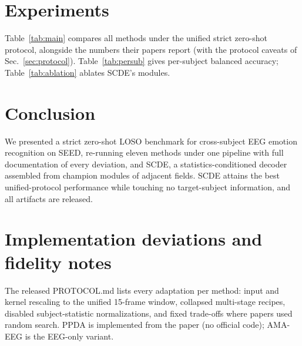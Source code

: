 \documentclass{article}
\newcommand{\method}{SCDE}
\begin{document}
\section{Experiments}
\label{sec:experiments}

Table~\ref{tab:main} compares all methods under the unified strict
zero-shot protocol, alongside the numbers their papers report (with the
protocol caveats of Sec.~\ref{sec:protocol}). Table~\ref{tab:persub} gives
per-subject balanced accuracy; Table~\ref{tab:ablation} ablates
\method{}'s modules.

\begin{table}[t]
\centering\small
\caption{Strict zero-shot LOSO on SEED under the unified protocol
(mean$\pm$SD over 15 test subjects). Paper-reported numbers quote the
original publications under their own protocols (\textit{n/r} where a metric
or a SEED result is not reported); they are \emph{not} comparable to the
unified columns by construction.}
\label{tab:main}

\end{table}

\begin{table}[t]
\centering\small
\caption{Per-subject balanced accuracy (\%) of all unified-rerun methods.}
\label{tab:persub}

\end{table}

\begin{table}[t]
\centering\small
\caption{Ablation of \method{} (balanced accuracy \%, mean$\pm$SD).}
\label{tab:ablation}

\end{table}

\section{Conclusion}
\label{sec:conclusion}

We presented a strict zero-shot LOSO benchmark for cross-subject EEG
emotion recognition on SEED, re-running eleven methods under one pipeline
with full documentation of every deviation, and \method{}, a
statistics-conditioned decoder assembled from champion modules of adjacent
fields. \method{} attains the best unified-protocol performance while
touching no target-subject information, and all artifacts are released.




\appendix
\section{Implementation deviations and fidelity notes}
\label{app:deviations}
The released PROTOCOL.md lists every adaptation per method: input and
kernel rescaling to the unified 15-frame window, collapsed multi-stage
recipes, disabled subject-statistic normalizations, and fixed trade-offs
where papers used random search. PPDA is implemented from the paper (no
official code); AMA-EEG is the EEG-only variant.
\end{document}
